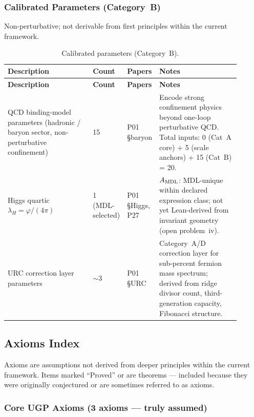 \subsubsection{Calibrated Parameters (Category~B)}
\label{sec:mi-calibrated}

Non-perturbative; not derivable from first principles within the current framework.

\begingroup\footnotesize\renewcommand{\arraystretch}{1.2}
\begin{longtable}{@{}P{0.37\linewidth}P{0.08\linewidth}P{0.10\linewidth}P{0.35\linewidth}@{}}
\caption{Calibrated parameters (Category~B).}
\label{tab:mi-calibrated}\\
\toprule
\textbf{Description} & \textbf{Count} & \textbf{Papers} & \textbf{Notes} \\
\midrule
\endfirsthead
\midrule
\textbf{Description} & \textbf{Count} & \textbf{Papers} & \textbf{Notes} \\
\midrule
\endhead
\bottomrule
\endfoot
QCD binding-model parameters (hadronic / baryon sector, non-perturbative confinement) &
  15 & P01 \S baryon &
  Encode strong confinement physics beyond one-loop perturbative QCD.
  Total inputs: 0 (Cat~A core) + 5 (scale anchors) + 15 (Cat~B) = 20. \\
Higgs quartic $\lambda_H = \varphi/(4\pi)$ &
  1 (MDL-selected) & P01 \S Higgs, P27 &
  $A_{\rm MDL}$: MDL-unique within declared expression class;
  not yet Lean-derived from invariant geometry (open problem~iv). \\
URC correction layer parameters &
  $\sim\!3$ & P01 \S URC &
  Category~A/D correction layer for sub-percent fermion mass spectrum;
  derived from ridge divisor count, third-generation capacity, Fibonacci structure. \\
\end{longtable}
\endgroup

\subsection{Axioms Index}
\label{sec:mi-axioms}

Axioms are assumptions not derived from deeper principles within the current framework.
Items marked ``Proved'' or \CatAL{} are theorems — included because they were
originally conjectured or are sometimes referred to as axioms.

\subsubsection{Core UGP Axioms (3 axioms — truly assumed)}
\label{sec:mi-core-axioms}

